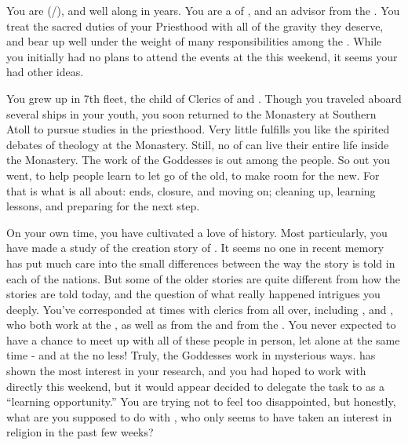 \documentclass[char]{GL2020}
\begin{document}
\name{\cEbbPriest{}}

You are \cEbbPriest{\full} (\cEbbPriest{\they}/\cEbbPriest{\them}), and well along in years. You are a \cEbbPriest{\cleric} of \cEbbFull{\full}, and an advisor from the \pShip{}. You treat the sacred duties of your Priesthood with all of the gravity they deserve, and bear up well under the weight of many responsibilities among the \pShippies{}. While you initially had no plans to attend the events at the \pSchool{} this weekend, it seems your \cEbb{\God} had other ideas.

You grew up in 7th fleet, the child of Clerics of \cEbb{} and \cFlow{}. Though you traveled aboard several ships in your youth, you soon returned to the Monastery at Southern Atoll to pursue studies in the priesthood. Very little fulfills you like the spirited debates of theology at the Monastery. Still, no \cEbbPriest{\cleric} of \cEbb{} can live their entire life inside the Monastery. The work of the Goddesses is out among the people. So out you went, to help people learn to let go of the old, to make room for the new. For that is what \cEbb{} is all about: ends, closure, and moving on; cleaning up, learning lessons, and preparing for the next step.

On your own time, you have cultivated a love of history. Most particularly, you have made a study of the creation story of \pEarth{}. It seems no one in recent memory has put much care into the small differences between the way the story is told in each of the nations. But some of the older stories are quite different from how the stories are told today, and the question of what really happened intrigues you deeply. You've corresponded at times with clerics from all over, including \cBeetle{\full}, and \cFlowPriest{\full}, who both work at the \pSchool{}, as well as \cAntiChup{\full} from the \pTech{} and \cHedonist{\full} from the \pFarm{}. You never expected to have a chance to meet up with all of these people in person, let alone at the same time - and at the \pSchool{} no less! Truly, the Goddesses work in mysterious ways. \cBeetle{} has shown the most interest in your research, and you had hoped to work with \cBeetle{\them} directly this weekend, but it would appear \cBeetle{\they} \cBeetle{\have} decided to delegate the task to  \cHeadScientist{\full} as a ``learning opportunity.'' You are trying not to feel too disappointed, but honestly, what are you supposed to do with \cHeadScientist{}, who only seems to have taken an interest in religion in the past few weeks? 
\end{document}
